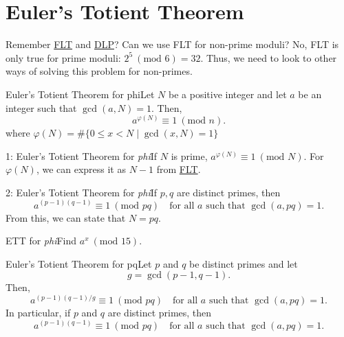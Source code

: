 \section{Euler's Totient Theorem}

Remember \hyperlink{thm:Fermat's Little Theorem}{FLT} and \hyperlink{Discrete Logarithm Problem}{DLP}? Can we use FLT for non-prime moduli? No, FLT is only true for prime moduli: \(2^5 \ (\text{mod 6}) = 32 \). Thus, we need to look to other ways of solving this problem for non-primes.

\begin{theorem}
    {Euler's Totient Theorem for phi}Let \(N\) be a positive integer and let \(a\) be an integer such that \(\gcd(a, N) = 1\). Then, \[
        a^{\varphi(N)} \equiv 1 \ (\text{mod }{n}).
    \] where \(\varphi(N) = \#\{0 \leq x < N \mid \gcd(x,N) = 1\}\)
\end{theorem}

\begin{corollary}
    {1: Euler's Totient Theorem for \textit{phi}}If \(N\) is prime, \(a^{\varphi(N)} \equiv 1 \ (\text{mod } N)\). For \(\varphi(N)\), we can express it as \(N-1\) from \hyperlink{thm:Fermat's Little Theorem}{FLT}.
\end{corollary}


\begin{corollary}
    {2: Euler's Totient Theorem for \textit{phi}}If \(p,q\) are distinct primes, then \[
        a^{(p-1)(q-1)} \equiv 1 \ (\text{mod } pq) \quad \text{for all } a  \text{ such that } \gcd(a, pq) = 1.
    \] From this, we can state that \(N = pq\).
\end{corollary}


\begin{example}
    {ETT for \textit{phi}}Find \(a^x \ (\text{mod } 15)\).
\end{example}



\begin{theorem}
    {Euler's Totient Theorem for pq}Let \(p\) and \(q\) be distinct primes and let \[
        g = \gcd(p-1, q-1).
    \]Then, \[
        a^{(p-1)(q-1)/g} \equiv 1 \ (\text{mod } pq) \quad \text{for all } a  \text{ such that } \gcd(a, pq) = 1.
    \] In particular, if \(p\) and \(q\) are distinct primes, then \[
        a^{(p-1)(q-1)} \equiv 1 \ (\text{mod } pq) \quad \text{for all } a  \text{ such that } \gcd(a, pq) = 1.
    \]
\end{theorem}

